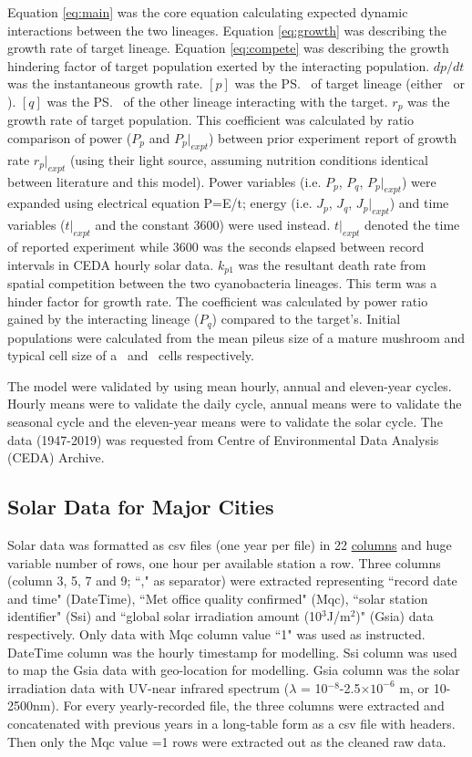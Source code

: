 \documentclass[../thesis.tex]{subfiles} %
\begin{document}
Equation \ref{eq:main} was the core equation calculating expected dynamic interactions between the two lineages.  Equation \ref{eq:growth} was describing the growth rate of target lineage.  Equation \ref{eq:compete} was describing the growth hindering factor of target population exerted by the interacting population.  $dp/dt$ was the instantaneous growth rate.  $[p]$ was the \ps\ of target lineage (either \Ss\ or \Cs).  $[q]$ was the \ps\ of the other lineage interacting with the target.  $r_p$ was the growth rate of target population.  This coefficient was calculated by ratio comparison of power ($P_p$ and $P_p|_{expt}$) between prior experiment report of growth rate $r_p|_{expt}$ (using their light source, assuming nutrition conditions identical between literature and this model).  Power variables (i.e. $P_p$, $P_q$, $P_p|_{expt}$) were expanded using electrical equation P=E/t; energy (i.e. $J_p$, $J_q$, $J_p|_{expt}$) and time variables ($t|_{expt}$ and the constant 3600) were used instead. $t|_{expt}$ denoted the time of reported experiment while 3600 was the seconds elapsed between record intervals in CEDA hourly solar data.  $k_{p1}$ was the resultant death rate from spatial competition between the two cyanobacteria lineages.  This term was a hinder factor for growth rate.  The coefficient was calculated by power ratio gained by the interacting lineage ($P_q$) compared to the target's.  Initial populations were calculated from the mean pileus size of a mature mushroom and typical cell size of a \Ss\ and \Cs\ cells respectively.

The model were validated by using mean hourly, annual and eleven-year cycles.  Hourly means were to validate the daily cycle, annual means were to validate the seasonal cycle and the eleven-year means were to validate the solar cycle.  The data (1947-2019) was requested from Centre of Environmental Data Analysis (CEDA) Archive.\autocite{solarData}

\subsection{Solar Data for Major Cities} %
Solar data was formatted as csv files (one year per file) in 22 \href{https://artefacts.ceda.ac.uk/badc_datadocs/ukmo-midas/RO_Table.html#definition}{columns} and huge variable number of rows, one hour per available station a row.  Three columns (column 3, 5, 7 and 9; ``," as separator) were extracted representing ``record date and time" (DateTime), ``Met office quality confirmed" (Mqc), ``solar station identifier" (Ssi) and ``global solar irradiation amount (10$^{3}$J/m$^{2}$)" (Gsia) data respectively.  Only data with Mqc column value ``1" was used as instructed.  DateTime column was the hourly timestamp for modelling. Ssi column was used to map the Gsia data with geo-location for modelling.  Gsia column was the solar irradiation data with UV-near infrared spectrum ($\lambda$ = 10$^{-8}$-2.5$\times10^{-6}$ m, or 10-2500nm).  For every yearly-recorded file, the three columns were extracted and concatenated with previous years in a long-table form as a csv file with headers.  Then only the Mqc value =1 rows were extracted out as the cleaned raw data.
\end{document}
